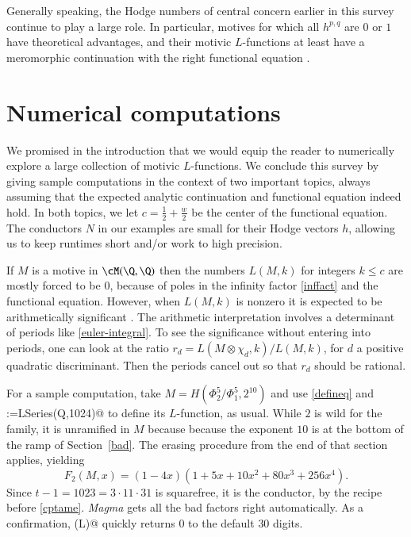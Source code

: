 \documentclass{notices}
\numberwithin{equation}{section}
\numberwithin{table}{section}
\numberwithin{figure}{section}
\begin{document}
{Generally speaking, the Hodge numbers 
of central concern earlier in this survey continue to play a large role.
In particular, motives for which all $h^{p,q}$ are $0$ or $1$ have theoretical
advantages, and their
motivic $L$-functions at least have a meromorphic
continuation with the right functional equation \cite{PT}.  








\section{Numerical computations}  
\label{numerical}
We promised in the introduction that we would equip  
the reader to numerically explore a large collection of motivic $L$-functions.
We conclude this survey by giving sample computations in the context of 
two important topics, always assuming that the expected analytic continuation 
and functional equation indeed hold.    In both topics, we let $c = \frac{1}{2}+\frac{w}{2}$ be the center of the functional equation.
The conductors $N$ in our examples are 
small for their Hodge vectors $h$, allowing us to keep runtimes short and/or
work to high precision.  


If $M$ is a motive in $\cM(\Q,\Q)$ then the numbers $L(M,k)$ for integers $k \leq c$ are 
mostly forced to be $0$, because of poles in the infinity factor \eqref{inffact}
and the functional equation.  However, when $L(M,k)$ is nonzero it is 
expected to be arithmetically significant \cite{Del-PL}.  The arithmetic interpretation involves a 
determinant of periods like \eqref{euler-integral}.  To see the significance
without entering into periods, one can look at the ratio 
$r_d = L(M \otimes \chi_d,k)/L(M,k)$, for $d$ a positive quadratic
discriminant.  Then the periods cancel out so that
$r_d$ should be rational.


For a sample computation, take $M=H(\Phi_2^5/\Phi_1^5,2^{10})$ and use
\eqref{defineq} and  
\verb@L:=LSeries(Q,1024)@ to define its $L$-function, as usual.    
While $2$ is wild for the family, it is unramified in 
$M$ because because the exponent $10$ is at the bottom 
of the ramp of Section~\ref{bad}.  The erasing procedure
from the end of that section applies, yielding  
\[
F_2(M,x) = (1-4x)(1+5x+10x^2+80 x^3 + 256 x^4).
\] 
Since 
$t - 1 =  1023 =  3 \cdot 11 \cdot 31$ is squarefree, it is the conductor,  by the recipe
before \eqref{cptame}.  {\em Magma} gets all the bad factors right automatically.  As a confirmation,
 \verb@CFENew(L)@ quickly returns $0$ to the default
$30$ digits.  


}
\end{document}
